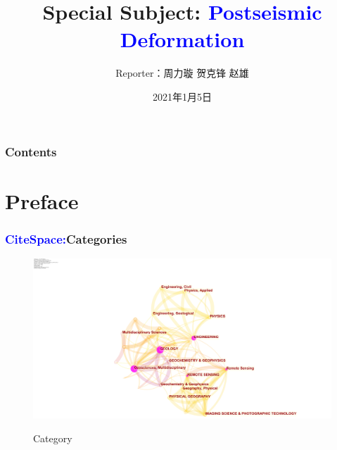 ﻿\documentclass{beamer}
\title[Postseismic Deformation]{Special Subject: \textcolor{blue}{Postseismic Deformation}}
\author{Reporter：周力璇 \quad 贺克锋 \quad 赵雄}
\institute[Whu]
{
Wuhan University \\
}
\date{2021年1月5日}
\begin{document}
\begin{frame}
\titlepage
\end{frame}


\begin{frame}
\frametitle{Contents}
\tableofcontents
\end{frame}

\section{Preface}

\begin{frame}
\frametitle{\textcolor{blue}{CiteSpace:}Categories}
\begin{figure}
  \centering
  \includegraphics[scale=0.1]{./pic/category.png}\\
  \caption{Category}\label{fig_okada}
\end{figure}
\end{frame}
\end{document}
